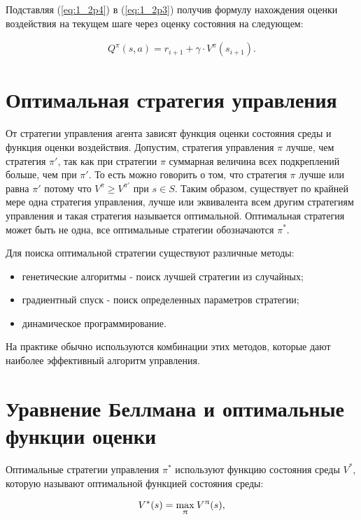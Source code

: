 Подставляя (\ref{eq:1_2p4}) в (\ref{eq:1_2p3}) получив формулу нахождения оценки воздействия на текущем шаге через оценку состояния на следующем:

\begin{equation}
\label{eq:1_2p5}
\begin{alignedat}{2}
Q^\pi(s, a) = r_{i+1} + \gamma\cdot V^\pi(s_{i+1}).
\end{alignedat}
\end{equation}

\section{Оптимальная стратегия управления} \label{sect1_4}

От стратегии управления агента зависят функция оценки состояния среды и функция оценки воздействия. Допустим, стратегия управления $ \pi $ лучше, чем стратегия $ \pi '$, так как при стратегии $ \pi $ суммарная величина всех подкреплений больше, чем при $ \pi '$. То есть можно говорить о том, что стратегия $ \pi $ лучше или равна $ \pi '$ потому что $ V^{\pi} \geq V^{\pi '} $ при $ s \in S $. Таким образом, существует по крайней мере одна стратегия управления, лучше или эквивалента всем другим стратегиям управления и такая стратегия называется оптимальной. Оптимальная стратегия может быть не одна, все оптимальные стратегии обозначаются $ \pi^* $. 

Для поиска оптимальной стратегии существуют различные методы:
\begin{itemize}
	\item генетические алгоритмы - поиск лучшей стратегии из случайных;
	\item градиентный спуск - поиск определенных параметров стратегии;
	\item динамическое программирование.
\end{itemize}
На практике обычно используются комбинации этих методов, которые дают наиболее эффективный алгоритм управления.


\section{Уравнение Беллмана и оптимальные функции оценки} \label{sect1_5}

Оптимальные стратегии управления $ \pi^* $ используют функцию состояния среды $ V^* $, которую называют оптимальной функцией состояния среды: 

\begin{equation}
\label{eq:1_5p1}
\begin{alignedat}{2}
V^*(s) = \smash{\displaystyle\max_{\pi}} \: V^{\pi}(s),
\end{alignedat}
\end{equation}

